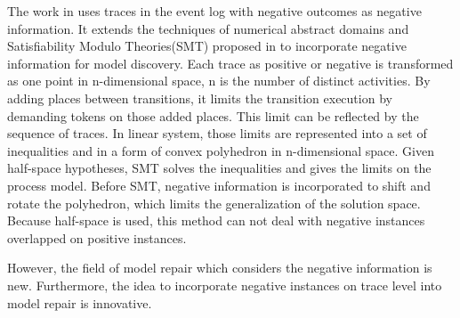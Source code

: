 The work in  \cite{ponce2016incorporating} uses traces in the event log with negative outcomes as negative information. It extends the techniques of numerical abstract domains and Satisfiability Modulo Theories(SMT) proposed in  \cite{carmona2014process} to incorporate negative information for model discovery. Each trace  as positive or negative is transformed as one point in n-dimensional space, n is the number of distinct activities. By adding places between transitions, it limits the transition execution by demanding tokens on those added places. This limit can be reflected by the sequence of traces.  In linear system, those limits are represented into a set of inequalities and in a form of convex polyhedron in n-dimensional space. Given half-space hypotheses, SMT solves the inequalities and gives the limits on the process model. Before SMT, negative information is incorporated to shift and rotate the polyhedron, which limits the generalization of the solution space. Because half-space is used, this method can not deal with negative instances overlapped on positive instances.


However, the field of model repair which considers the negative information is new. Furthermore, the idea to incorporate negative instances on trace level into model repair is innovative.  

\iffalse
Compared to this, our approach is innovative mainly in the following aspects. 
\begin{itemize}
	\item Incorporate the negative information into model repair. 
	\item Analyze the long-term dependency in the model to provide a preciser result. 
	\item Analyze Model on Trace level. All activities constituting a trace are considered. 
\end{itemize}
\fi